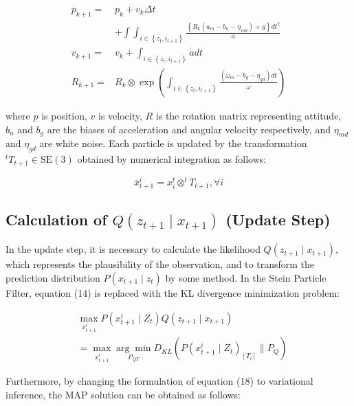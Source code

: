 \documentclass[a4paper,fleqn,10pt,twocolumn]{SICE_ISCS}
\begin{document}
\begin{equation}
\begin{aligned}
p_{k+1}= & p_{k}+v_{k} \Delta t \\
& +\int \int_{i \in\left\{z_{t}, i_{t+1}\right\}} \frac{\left\{R_{k}\left(a_{m}-b_{n}-\eta_{m d}\right)+g\right\} d t^{2}}{\dot{a}} \\
v_{k+1}= & v_{k}+\int_{i \in\left\{z_{t}, i_{t+1}\right\}} \dot{a} d t \\
R_{k+1}= & R_{k} \otimes \exp \left(\int_{i \in\left\{z_{t}, i_{t+1}\right\}} \frac{\left(\omega_{m}-b_{g}-\eta_{g d}\right) d t}{\dot{\omega}}\right)
\end{aligned}
\end{equation}

where $p$ is position, $v$ is velocity, $R$ is the rotation matrix representing attitude, $b_{n}$ and $b_{g}$ are the biases of acceleration and angular velocity respectively, and $\eta_{m d}$ and $\eta_{g d}$ are white noise. Each particle is updated by the transformation ${ }^{t} T_{t+1} \in \mathrm{SE}(3)$ obtained by numerical integration as follows:

\begin{equation}
\bar{x}_{t+1}^{i}=x_{i}^{t} \otimes^{t} T_{t+1}, \forall i
\end{equation}

\subsection{Calculation of $Q\left(z_{t+1} \mid x_{t+1}\right)$ (Update Step)}
In the update step, it is necessary to calculate the likelihood $Q\left(z_{t+1} \mid x_{t+1}\right)$, which represents the plausibility of the observation, and to transform the prediction distribution $P\left(x_{t+1} \mid z_{t}\right)$ by some method. In the Stein Particle Filter, equation (14) is replaced with the KL divergence minimization problem:

\begin{equation}
\begin{aligned}
& \max _{x_{t+1}^{i}} P\left(x_{t+1}^{i} \mid Z_{t}\right) Q\left(z_{t+1} \mid x_{t+1}\right) \\
& =\max _{x_{t+1}^{i}} \underset{P_{Q T}}{\arg \min } D_{K L}\left(P\left(x_{t+1}^{i} \mid Z_{t}\right)_{\left[T_{i}\right]} \| P_{Q}\right)
\end{aligned}
\end{equation}

Furthermore, by changing the formulation of equation (18) to variational inference, the MAP solution can be obtained as follows:
\end{document}
